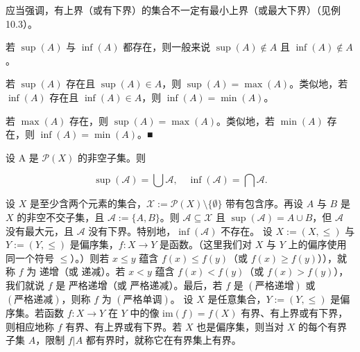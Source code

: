 \begin{remark}

\begin{items}
\item

应当强调，有上界（或有下界）的集合不一定有最小上界（或最大下界）（见例 10.3）。

\item

若  $ \sup(A) $ 与  $ \inf(A) $ 都存在，则一般来说  $ \sup(A) \notin A $ 且  $ \inf(A) \notin A $。

\item

若 $\sup(A)$ 存在且 $\sup(A) \in A$，则 $\sup(A) = \max(A)$。类似地，若 $\inf(A)$ 存在且 $\inf(A) \in A$，则 $\inf(A) = \min(A)$。

\item

若  $ \max(A) $ 存在，则  $ \sup(A) = \max(A) $。类似地，若  $ \min(A) $ 存在，则  $ \inf(A) = \min(A) $。■

\end{items}

\end{remark}

\begin{example}

\begin{items}
\item

设 A 是  $ \mathcal{P}(X) $ 的非空子集。则

\[
\sup(\mathcal{A})=\bigcup\mathcal{A},\quad\inf(\mathcal{A})=\bigcap\mathcal{A}.
\]
\item

设 $X$ 是至少含两个元素的集合，$\mathcal{X} := \mathcal{P}(X) \setminus \{\emptyset\}$ 带有包含序。再设 $A$ 与 $B$ 是 $X$ 的非空不交子集，且 $\mathcal{A} := \{A, B\}$。则 $\mathcal{A} \subseteq \mathcal{X}$ 且 $\sup(\mathcal{A}) = A \cup B$，但 $\mathcal{A}$ 没有最大元，且 $\mathcal{A}$ 没有下界。特别地，$\inf(\mathcal{A})$ 不存在。
设 $X := (X, \leq)$ 与 $Y := (Y, \leq)$ 是偏序集，$f: X \to Y$ 是函数。（这里我们对 $X$ 与 $Y$ 上的偏序使用同一个符号 $\leq$）。）则若 $x \leq y$ 蕴含 $f(x) \leq f(y)$（或 $f(x) \geq f(y)$）），就称 $f$ 为 $\text{递增}$（或 $\text{递减}$）。若 $x < y$ 蕴含 $f(x) < f(y)$（或 $f(x) > f(y)$），我们就说 $f$ 是 $\text{严格递增}$（或 $\text{严格递减}$）。最后，若 $f$ 是 $(\text{严格递增})$ 或 $(\text{严格递减})$，则称 $f$ 为 $(\text{严格单调})$。
设 $X$ 是任意集合，$Y := (Y, \leq)$ 是偏序集。若函数 $f: X \to Y$ 在 $Y$ 中的像 $\mathrm{im}(f) = f(X)$ 有界、有上界或有下界，则相应地称 $f$ 有界、有上界或有下界。若 $X$ 也是偏序集，则当对 $X$ 的每个有界子集 $A$，限制 $f|A$ 都有界时，就称它在有界集上有界。

\end{items}

\end{example}

